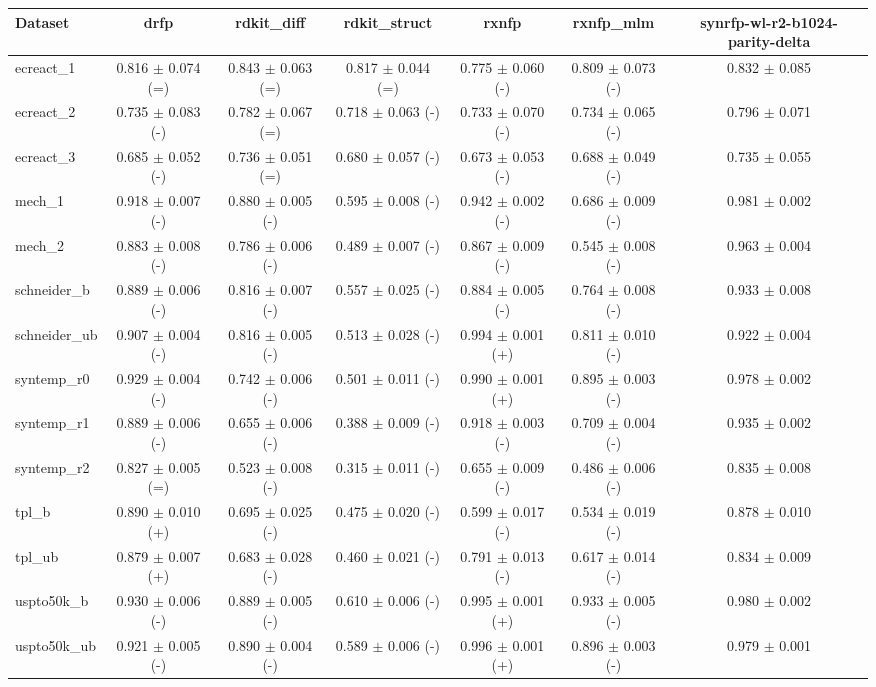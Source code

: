 \begin{tabular}{lcccccc}
\toprule
Dataset & drfp & rdkit\_diff & rdkit\_struct & rxnfp & rxnfp\_mlm & synrfp-wl-r2-b1024-parity-delta \\
\midrule
ecreact\_1 & 0.816 $\pm$ 0.074 (=) & 0.843 $\pm$ 0.063 (=) & 0.817 $\pm$ 0.044 (=) & 0.775 $\pm$ 0.060 (-) & 0.809 $\pm$ 0.073 (-) & 0.832 $\pm$ 0.085 \\
ecreact\_2 & 0.735 $\pm$ 0.083 (-) & 0.782 $\pm$ 0.067 (=) & 0.718 $\pm$ 0.063 (-) & 0.733 $\pm$ 0.070 (-) & 0.734 $\pm$ 0.065 (-) & 0.796 $\pm$ 0.071 \\
ecreact\_3 & 0.685 $\pm$ 0.052 (-) & 0.736 $\pm$ 0.051 (=) & 0.680 $\pm$ 0.057 (-) & 0.673 $\pm$ 0.053 (-) & 0.688 $\pm$ 0.049 (-) & 0.735 $\pm$ 0.055 \\
mech\_1 & 0.918 $\pm$ 0.007 (-) & 0.880 $\pm$ 0.005 (-) & 0.595 $\pm$ 0.008 (-) & 0.942 $\pm$ 0.002 (-) & 0.686 $\pm$ 0.009 (-) & 0.981 $\pm$ 0.002 \\
mech\_2 & 0.883 $\pm$ 0.008 (-) & 0.786 $\pm$ 0.006 (-) & 0.489 $\pm$ 0.007 (-) & 0.867 $\pm$ 0.009 (-) & 0.545 $\pm$ 0.008 (-) & 0.963 $\pm$ 0.004 \\
schneider\_b & 0.889 $\pm$ 0.006 (-) & 0.816 $\pm$ 0.007 (-) & 0.557 $\pm$ 0.025 (-) & 0.884 $\pm$ 0.005 (-) & 0.764 $\pm$ 0.008 (-) & 0.933 $\pm$ 0.008 \\
schneider\_ub & 0.907 $\pm$ 0.004 (-) & 0.816 $\pm$ 0.005 (-) & 0.513 $\pm$ 0.028 (-) & 0.994 $\pm$ 0.001 (+) & 0.811 $\pm$ 0.010 (-) & 0.922 $\pm$ 0.004 \\
syntemp\_r0 & 0.929 $\pm$ 0.004 (-) & 0.742 $\pm$ 0.006 (-) & 0.501 $\pm$ 0.011 (-) & 0.990 $\pm$ 0.001 (+) & 0.895 $\pm$ 0.003 (-) & 0.978 $\pm$ 0.002 \\
syntemp\_r1 & 0.889 $\pm$ 0.006 (-) & 0.655 $\pm$ 0.006 (-) & 0.388 $\pm$ 0.009 (-) & 0.918 $\pm$ 0.003 (-) & 0.709 $\pm$ 0.004 (-) & 0.935 $\pm$ 0.002 \\
syntemp\_r2 & 0.827 $\pm$ 0.005 (=) & 0.523 $\pm$ 0.008 (-) & 0.315 $\pm$ 0.011 (-) & 0.655 $\pm$ 0.009 (-) & 0.486 $\pm$ 0.006 (-) & 0.835 $\pm$ 0.008 \\
tpl\_b & 0.890 $\pm$ 0.010 (+) & 0.695 $\pm$ 0.025 (-) & 0.475 $\pm$ 0.020 (-) & 0.599 $\pm$ 0.017 (-) & 0.534 $\pm$ 0.019 (-) & 0.878 $\pm$ 0.010 \\
tpl\_ub & 0.879 $\pm$ 0.007 (+) & 0.683 $\pm$ 0.028 (-) & 0.460 $\pm$ 0.021 (-) & 0.791 $\pm$ 0.013 (-) & 0.617 $\pm$ 0.014 (-) & 0.834 $\pm$ 0.009 \\
uspto50k\_b & 0.930 $\pm$ 0.006 (-) & 0.889 $\pm$ 0.005 (-) & 0.610 $\pm$ 0.006 (-) & 0.995 $\pm$ 0.001 (+) & 0.933 $\pm$ 0.005 (-) & 0.980 $\pm$ 0.002 \\
uspto50k\_ub & 0.921 $\pm$ 0.005 (-) & 0.890 $\pm$ 0.004 (-) & 0.589 $\pm$ 0.006 (-) & 0.996 $\pm$ 0.001 (+) & 0.896 $\pm$ 0.003 (-) & 0.979 $\pm$ 0.001 \\
\bottomrule
\end{tabular}

